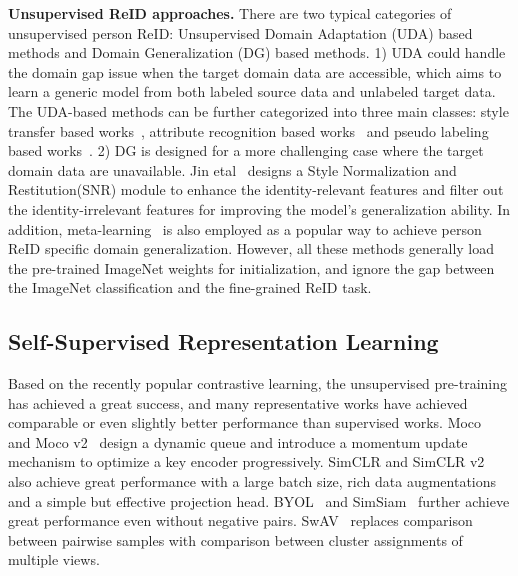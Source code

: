 \documentclass[10pt,twocolumn,letterpaper]{article}
\begin{document}
\noindent\textbf{Unsupervised ReID approaches.} There are two typical categories of unsupervised person ReID: Unsupervised Domain Adaptation (UDA) based methods and Domain Generalization (DG) based methods. 1) UDA could handle the domain gap issue when the target domain data are accessible, which aims to learn a generic model from both labeled source data and unlabeled target data. The UDA-based methods can be further categorized into three main classes: style transfer based works~\cite{deng2018image,wei2018person,zheng2019joint}, attribute recognition based works~\cite{wang2018transferable,qi2019novel} and pseudo labeling based works~\cite{song2020unsupervised,ge2020mutual,ge2020self}. 2) DG is designed for a more challenging case where the target domain data are unavailable. Jin etal~\cite{jin2020style} designs a Style Normalization and Restitution(SNR) module to enhance the identity-relevant features and filter out the identity-irrelevant features for improving the model's generalization ability. In addition, meta-learning~\cite{zhao2021learning} is also employed as a popular way to achieve person ReID specific domain generalization. However, all these methods generally load the pre-trained ImageNet weights for initialization, and ignore the gap between the ImageNet classification and the fine-grained ReID task.


\subsection{Self-Supervised Representation Learning}

Based on the recently popular contrastive learning, the unsupervised pre-training has achieved a great success, and many representative works have achieved comparable or even slightly better performance than supervised works. Moco~\cite{he2020momentum} and Moco v2~\cite{chen2020improved} design a dynamic queue and introduce a momentum update mechanism to optimize a key encoder progressively. SimCLR\cite{chen2020simple} and SimCLR v2~\cite{chen2020big} also achieve great performance with a large batch size, rich data augmentations and a simple but effective projection head. BYOL~\cite{grill2020bootstrap} and SimSiam~\cite{chen2021exploring} further achieve great performance even without negative pairs. SwAV~\cite{caron2020unsupervised} replaces comparison between pairwise samples with comparison between cluster assignments of multiple views.
\end{document}
